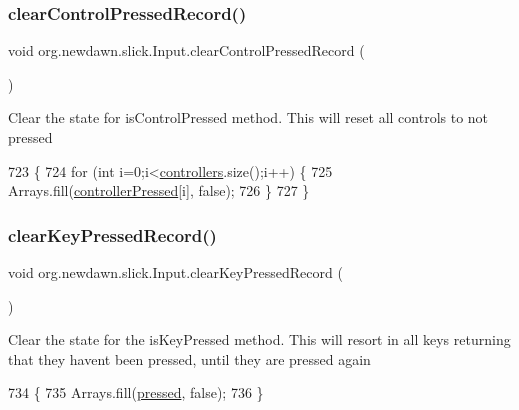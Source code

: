 \subsubsection{\texorpdfstring{clear\+Control\+Pressed\+Record()}{clearControlPressedRecord()}}
{\footnotesize\ttfamily void org.\+newdawn.\+slick.\+Input.\+clear\+Control\+Pressed\+Record (\begin{DoxyParamCaption}{ }\end{DoxyParamCaption})\hspace{0.3cm}{\ttfamily [inline]}}

Clear the state for is\+Control\+Pressed method. This will reset all controls to not pressed 
\begin{DoxyCode}
723                                             \{
724         \textcolor{keywordflow}{for} (\textcolor{keywordtype}{int} i=0;i<\mbox{\hyperlink{classorg_1_1newdawn_1_1slick_1_1_input_a1bcc91bf0db9efc578bd934a8ed9ce67}{controllers}}.size();i++) \{
725             Arrays.fill(\mbox{\hyperlink{classorg_1_1newdawn_1_1slick_1_1_input_a388a6d0a6069e1344ed26102b5d54c86}{controllerPressed}}[i], \textcolor{keyword}{false});
726         \}
727     \}
\end{DoxyCode}
\mbox{\label{classorg_1_1newdawn_1_1slick_1_1_input_a0c1b796b24304c122ad233e9d70bdc73}} 
\subsubsection{\texorpdfstring{clear\+Key\+Pressed\+Record()}{clearKeyPressedRecord()}}
{\footnotesize\ttfamily void org.\+newdawn.\+slick.\+Input.\+clear\+Key\+Pressed\+Record (\begin{DoxyParamCaption}{ }\end{DoxyParamCaption})\hspace{0.3cm}{\ttfamily [inline]}}

Clear the state for the {\ttfamily is\+Key\+Pressed} method. This will resort in all keys returning that they haven\textquotesingle{}t been pressed, until they are pressed again 
\begin{DoxyCode}
734                                         \{
735         Arrays.fill(\mbox{\hyperlink{classorg_1_1newdawn_1_1slick_1_1_input_a3cc93977afce568be4f0f9dbb43fe722}{pressed}}, \textcolor{keyword}{false});
736     \}
\end{DoxyCode}
\mbox{\label{classorg_1_1newdawn_1_1slick_1_1_input_ac93fc5f763ff9031b095ecdaa118c6c3}} 
